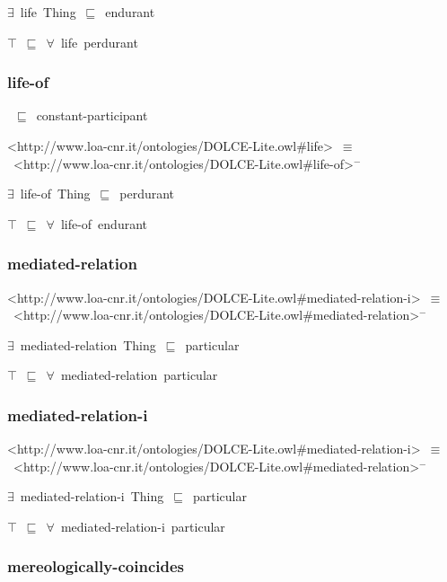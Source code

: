 \documentclass{article}
\begin{document}
\ensuremath{\exists}~life~Thing~\ensuremath{\sqsubseteq}~endurant

\ensuremath{\top}~\ensuremath{\sqsubseteq}~\ensuremath{\forall}~life~perdurant

\subsubsection*{life-of}

~\ensuremath{\sqsubseteq}~constant-participant

<http://www.loa-cnr.it/ontologies/DOLCE-Lite.owl#life>~\ensuremath{\equiv}~<http://www.loa-cnr.it/ontologies/DOLCE-Lite.owl#life-of>\ensuremath{^-}

\ensuremath{\exists}~life-of~Thing~\ensuremath{\sqsubseteq}~perdurant

\ensuremath{\top}~\ensuremath{\sqsubseteq}~\ensuremath{\forall}~life-of~endurant

\subsubsection*{mediated-relation}

<http://www.loa-cnr.it/ontologies/DOLCE-Lite.owl#mediated-relation-i>~\ensuremath{\equiv}~<http://www.loa-cnr.it/ontologies/DOLCE-Lite.owl#mediated-relation>\ensuremath{^-}

\ensuremath{\exists}~mediated-relation~Thing~\ensuremath{\sqsubseteq}~particular

\ensuremath{\top}~\ensuremath{\sqsubseteq}~\ensuremath{\forall}~mediated-relation~particular

\subsubsection*{mediated-relation-i}

<http://www.loa-cnr.it/ontologies/DOLCE-Lite.owl#mediated-relation-i>~\ensuremath{\equiv}~<http://www.loa-cnr.it/ontologies/DOLCE-Lite.owl#mediated-relation>\ensuremath{^-}

\ensuremath{\exists}~mediated-relation-i~Thing~\ensuremath{\sqsubseteq}~particular

\ensuremath{\top}~\ensuremath{\sqsubseteq}~\ensuremath{\forall}~mediated-relation-i~particular

\subsubsection*{mereologically-coincides}
\end{document}
